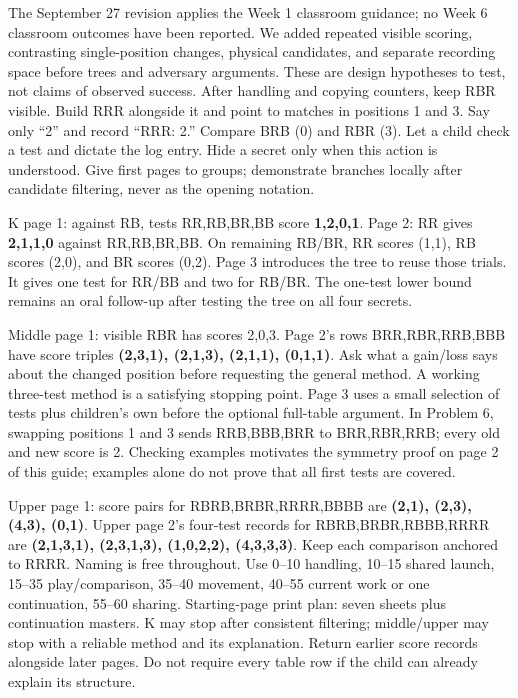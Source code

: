 \documentclass[11pt]{article}
\begin{document}
\newpage
{}
The September 27 revision applies the Week 1 classroom guidance; no Week 6 classroom outcomes have been reported. We added repeated visible scoring, contrasting single-position changes, physical candidates, and separate recording space before trees and adversary arguments. These are design hypotheses to test, not claims of observed success.
After handling and copying counters, keep RBR visible. Build RRR alongside it and point to matches in positions 1 and 3. Say only ``2'' and record ``RRR: 2.'' Compare BRB (0) and RBR (3). Let a child check a test and dictate the log entry. Hide a secret only when this action is understood. Give first pages to groups; demonstrate branches locally after candidate filtering, never as the opening notation.

K page 1: against RB, tests RR,RB,BR,BB score \textbf{1,2,0,1}. Page 2: RR gives \textbf{2,1,1,0} against RR,RB,BR,BB. On remaining RB/BR, RR scores (1,1), RB scores (2,0), and BR scores (0,2). Page 3 introduces the tree to reuse those trials. It gives one test for RR/BB and two for RB/BR. The one-test lower bound remains an oral follow-up after testing the tree on all four secrets.

Middle page 1: visible RBR has scores 2,0,3. Page 2's rows BRR,RBR,RRB,BBB have score triples \textbf{(2,3,1), (2,1,3), (2,1,1), (0,1,1)}. Ask what a gain/loss says about the changed position before requesting the general method. A working three-test method is a satisfying stopping point. Page 3 uses a small selection of tests plus children's own before the optional full-table argument. In Problem 6, swapping positions 1 and 3 sends RRB,BBB,BRR to BRR,RBR,RRB; every old and new score is 2. Checking examples motivates the symmetry proof on page 2 of this guide; examples alone do not prove that all first tests are covered.

Upper page 1: score pairs for RBRB,BRBR,RRRR,BBBB are \textbf{(2,1), (2,3), (4,3), (0,1)}. Upper page 2's four-test records for RBRB,BRBR,RBBB,RRRR are \textbf{(2,1,3,1), (2,3,1,3), (1,0,2,2), (4,3,3,3)}. Keep each comparison anchored to RRRR. Naming is free throughout.
Use 0--10 handling, 10--15 shared launch, 15--35 play/comparison, 35--40 movement, 40--55 current work or one continuation, 55--60 sharing. Starting-page print plan: seven sheets plus continuation masters. K may stop after consistent filtering; middle/upper may stop with a reliable method and its explanation. Return earlier score records alongside later pages. Do not require every table row if the child can already explain its structure.
\end{document}
